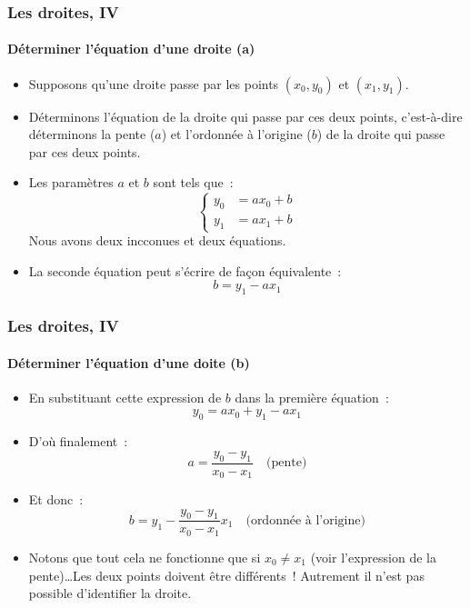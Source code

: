 \documentclass[10pt,notheorems]{beamer}
\theoremstyle{plain}
\theoremstyle{definition} %
\begin{document}
\begin{frame}
  \frametitle{Les droites, IV}
  \framesubtitle{Déterminer l'équation d'une droite (a)}
  \hypertarget{slide_droites_4_1}{}

  \bigskip

  \begin{itemize}

  \item Supposons qu'une droite passe par les points $(x_0,y_0)$ et $(x_1,y_1)$.\newline

  \item Déterminons l'équation de la droite qui passe par ces deux
    points, c'est-à-dire déterminons la pente ($a$) et l'ordonnée à
    l'origine ($b$) de la droite qui passe par ces deux points.\newline

  \item Les paramètres $a$ et $b$ sont tels que~:
    \[
      \begin{cases}
        y_0 &= a x_0 + b\\
        y_1 &= a x_1 + b
      \end{cases}
    \]
    Nous avons deux incconues et deux équations.\newline

  \item La seconde équation peut s'écrire de façon équivalente~:
    \[
      b = y_1 - a x_1
    \]
  \end{itemize}

\end{frame}


\begin{frame}
  \frametitle{Les droites, IV}
  \framesubtitle{Déterminer l'équation d'une doite (b)}
  \hypertarget{slide_droites_4_2}{}

  \bigskip

  \begin{itemize}

  \item En substituant cette expression de $b$ dans la première équation~:
    \[
      y_0 = a x_0 +y_1 - a x_1
    \]

  \item D'où finalement~:
    \[
      a = \frac{y_0-y_1}{x_0-x_1}\quad\text{(pente)}
    \]

  \item Et donc~:
    \[
      b = y_1 - \frac{y_0-y_1}{x_0-x_1} x_1\quad\text{(ordonnée à l'origine)}
    \]

  \item Notons que tout cela ne fonctionne que si $x_0\neq x_1$ (voir l'expression de la pente)\ldots Les deux points doivent être différents~! Autrement il n'est pas possible d'identifier la droite.

  \end{itemize}

\end{frame}
\end{document}
